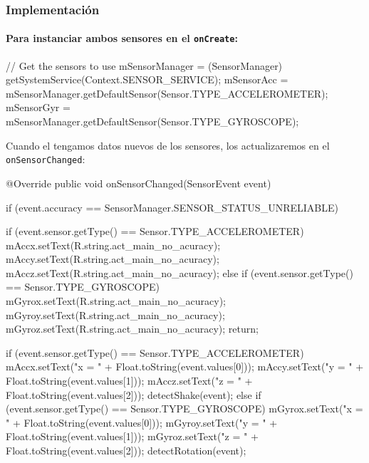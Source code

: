 \documentclass[	DIV=calc,%
							paper=a4,%
							fontsize=11pt]{scrartcl}	 					%
\begin{document}
\subsubsection{Implementación}\label{implementaciuxf3n-3}

\paragraph{Para instanciar ambos sensores en el
\texttt{onCreate}:}\label{para-instanciar-ambos-sensores-en-el-oncreate}

\begin{javacode}
	// Get the sensors to use
	mSensorManager = (SensorManager) getSystemService(Context.SENSOR_SERVICE);
	mSensorAcc = mSensorManager.getDefaultSensor(Sensor.TYPE_ACCELEROMETER);
	mSensorGyr = mSensorManager.getDefaultSensor(Sensor.TYPE_GYROSCOPE);
\end{javacode}

Cuando el tengamos datos nuevos de los sensores, los actualizaremos en
el \texttt{onSensorChanged}:

\begin{javacode}
	@Override
	public void onSensorChanged(SensorEvent event) {

			if (event.accuracy == SensorManager.SENSOR_STATUS_UNRELIABLE) {

					if (event.sensor.getType() == Sensor.TYPE_ACCELEROMETER) {
							mAccx.setText(R.string.act_main_no_acuracy);
							mAccy.setText(R.string.act_main_no_acuracy);
							mAccz.setText(R.string.act_main_no_acuracy);
					} else if (event.sensor.getType() == Sensor.TYPE_GYROSCOPE) {
							mGyrox.setText(R.string.act_main_no_acuracy);
							mGyroy.setText(R.string.act_main_no_acuracy);
							mGyroz.setText(R.string.act_main_no_acuracy);
					}
					return;
			}

			if (event.sensor.getType() == Sensor.TYPE_ACCELEROMETER) {
					mAccx.setText("x = " + Float.toString(event.values[0]));
					mAccy.setText("y = " + Float.toString(event.values[1]));
					mAccz.setText("z = " + Float.toString(event.values[2]));
					detectShake(event);
			} else if (event.sensor.getType() == Sensor.TYPE_GYROSCOPE) {
					mGyrox.setText("x = " + Float.toString(event.values[0]));
					mGyroy.setText("y = " + Float.toString(event.values[1]));
					mGyroz.setText("z = " + Float.toString(event.values[2]));
					detectRotation(event);
			}

	}
\end{javacode}
\end{document}
